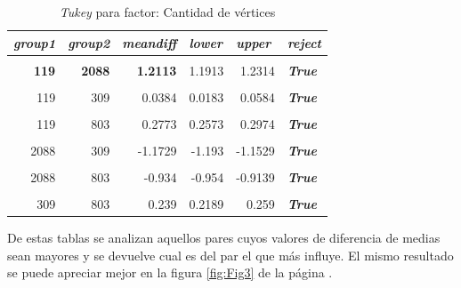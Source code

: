 \documentclass{article}
\begin{document}
\begin{table}[htbp]
  \centering
  \caption{\textit{Tukey} para factor: Cantidad de vértices}
    \begin{tabular}{rrrrrl}
    \toprule
    \multicolumn{1}{l}{\textit{\textbf{group1}}} & \multicolumn{1}{l}{\textit{\textbf{group2}}} & \multicolumn{1}{l}{\textit{\textbf{meandiff}}} & \multicolumn{1}{l}{\textit{\textbf{lower}}} & \multicolumn{1}{l}{\textit{\textbf{upper}}} & \textit{\textbf{reject}} \\
    \midrule
          &       &       &       &       &  \\
    \textbf{119} & \textbf{2088} & \textbf{1.2113} & 1.1913 & 1.2314 & \textit{\textbf{True}} \\
          &       &       &       &       &  \\
    119   & 309   & 0.0384 & 0.0183 & 0.0584 & \textit{\textbf{True}} \\
          &       &       &       &       &  \\
    119   & 803   & 0.2773 & 0.2573 & 0.2974 & \textit{\textbf{True}} \\
          &       &       &       &       &  \\
    2088  & 309   & -1.1729 & -1.193 & -1.1529 & \textit{\textbf{True}} \\
          &       &       &       &       &  \\
    2088  & 803   & -0.934 & -0.954 & -0.9139 & \textit{\textbf{True}} \\
          &       &       &       &       &  \\
    309   & 803   & 0.239 & 0.2189 & 0.259 & \textit{\textbf{True}} \\
    \bottomrule
    \end{tabular}%
  \label{tab:addlabel}%
\end{table}%

De estas tablas se analizan aquellos pares cuyos valores de diferencia de medias sean mayores y se devuelve cual es del par el que más influye. El mismo resultado se puede apreciar mejor en la figura \ref{fig:Fig3} de la página \pageref{fig:Fig3}.
\end{document}
